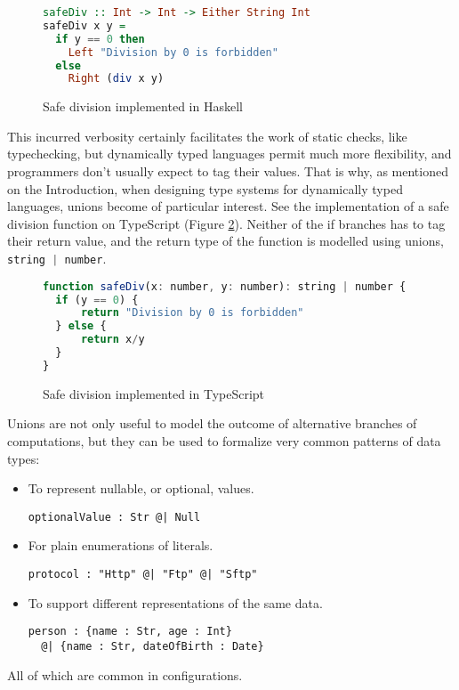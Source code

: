 \documentclass[sigplan,10pt,review,anonymous]{acmart}
\newcommand{\typescript}[1]{\lstinline[language=JavaScript]{#1}}
\begin{document}
\begin{figure}[h]
\begin{lstlisting}[language=Haskell]
safeDiv :: Int -> Int -> Either String Int
safeDiv x y =
  if y == 0 then
    Left "Division by 0 is forbidden"
  else
    Right (div x y)
\end{lstlisting}
\caption{Safe division implemented in Haskell}
\label{fig:safediv-haskell}
\end{figure}

This incurred verbosity certainly facilitates the work of static checks,
like typechecking, but dynamically typed languages permit much more flexibility,
and programmers don't usually expect to tag their values.
That is why, as mentioned on the Introduction, when designing
type systems for dynamically typed languages, unions become of particular
interest.
See the implementation of a safe division function on TypeScript
(Figure \ref{fig:safediv-ts}).
Neither of the if branches has to tag their return value, and the return
type of the function is modelled using unions, \typescript{string | number}.


\begin{figure}[h]
\begin{lstlisting}[language=JavaScript]
function safeDiv(x: number, y: number): string | number {
  if (y == 0) {
      return "Division by 0 is forbidden"
  } else {
      return x/y
  }
}
\end{lstlisting}
\caption{Safe division implemented in TypeScript}
\label{fig:safediv-ts}
\end{figure}


Unions are not only useful to model the outcome of alternative
branches of computations, but they can be used to
formalize very common patterns of data types:
\begin{itemize}
    \item To represent nullable, or optional, values.
\begin{lstlisting}[language=nickel]
optionalValue : Str @| Null
\end{lstlisting}

    \item For plain enumerations of literals.
\begin{lstlisting}[language=nickel]
protocol : "Http" @| "Ftp" @| "Sftp"
\end{lstlisting}

    \item To support different representations of the same data.
\begin{lstlisting}[language=nickel]
person : {name : Str, age : Int}
  @| {name : Str, dateOfBirth : Date}
\end{lstlisting}

\end{itemize}
All of which are common in configurations.
\end{document}

